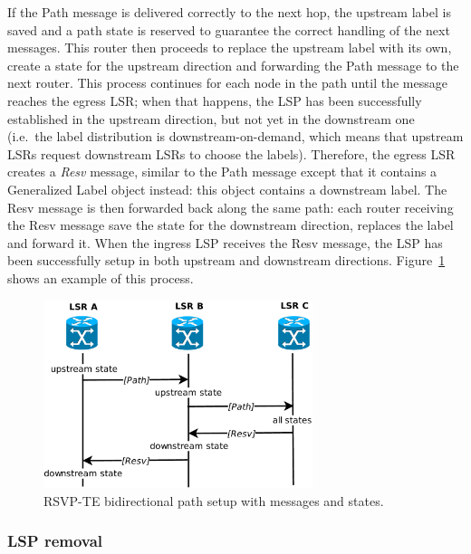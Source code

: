 \documentclass[10pt,a4paper]{report}
\begin{document}
If the Path message is delivered correctly to the next hop, the
upstream label is saved and a path state is reserved to guarantee the
correct handling of the next messages. This router then proceeds to
replace the upstream label with its own, create a state for the
upstream direction and forwarding the Path message to the next
router. This process continues for each node in the path until the
message reaches the egress LSR; when that happens, the LSP has been
successfully established in the upstream direction, but not yet in the
downstream one (i.e.\ the label distribution is downstream-on-demand,
which means that upstream LSRs request downstream LSRs to choose the
labels). Therefore, the egress LSR creates a \textit{Resv} message,
similar to the Path message except that it contains a Generalized
Label object instead: this object contains a downstream label. The
Resv message is then forwarded back along the same path: each router
receiving the Resv message save the state for the downstream
direction, replaces the label and forward it. When the ingress LSP
receives the Resv message, the LSP has been successfully setup in both
upstream and downstream directions. Figure~\ref{fig:rsvp_path} shows
an example of this process.

\begin{figure}[!htbp]
  \centering
  \includegraphics[width=0.7\textwidth]{img/rsvp_path}
  \caption[RSVP-TE path setup]{RSVP-TE bidirectional path setup with
    messages and states.}
  \label{fig:rsvp_path}
\end{figure}

\subsubsection{LSP removal}
\end{document}
